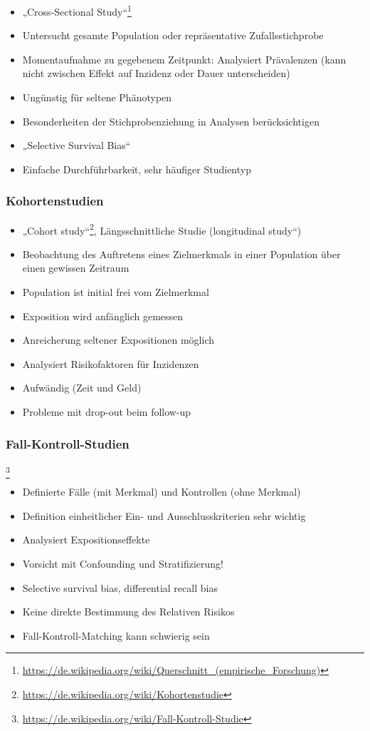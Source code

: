 \begin{itemize}
	\item „Cross-Sectional Study“\footnote{\url{https://de.wikipedia.org/wiki/Querschnitt_(empirische_Forschung)}}
	\item Untersucht gesamte Population oder repräsentative Zufallsstichprobe
	\item Momentaufnahme zu gegebenem Zeitpunkt: Analysiert Prävalenzen (kann nicht zwischen Effekt auf Inzidenz oder Dauer unterscheiden)
	\item Ungünstig für seltene Phänotypen
	\item Besonderheiten der Stichprobenziehung in Analysen berücksichtigen
	\item „Selective Survival Bias“
	\item Einfache Durchführbarkeit, sehr häufiger Studientyp
\end{itemize}

\subsubsection{Kohortenstudien}
\begin{itemize}
	\item „Cohort study“\footnote{\url{https://de.wikipedia.org/wiki/Kohortenstudie}}, Längsschnittliche Studie (longitudinal study“)
	\item Beobachtung des Auftretens eines Zielmerkmals in einer Population über einen gewissen Zeitraum
	\item Population ist initial frei vom Zielmerkmal
	\item Exposition wird anfänglich gemessen
	\item Anreicherung seltener Expositionen möglich
	\item Analysiert Risikofaktoren für Inzidenzen
	\item Aufwändig (Zeit und Geld)
	\item Probleme mit drop-out beim follow-up
\end{itemize}

\subsubsection{Fall-Kontroll-Studien}\footnote{\url{https://de.wikipedia.org/wiki/Fall-Kontroll-Studie}}
\begin{itemize}
	\item Definierte Fälle (mit Merkmal) und Kontrollen (ohne Merkmal)
	\item Definition einheitlicher Ein- und Ausschlusskriterien sehr wichtig
	\item Analysiert Expositionseffekte
	\item Vorsicht mit Confounding und Stratifizierung!
	\item Selective survival bias, differential recall bias
	\item Keine direkte Bestimmung des Relativen Risikos
	\item Fall-Kontroll-Matching kann schwierig sein
\end{itemize}

